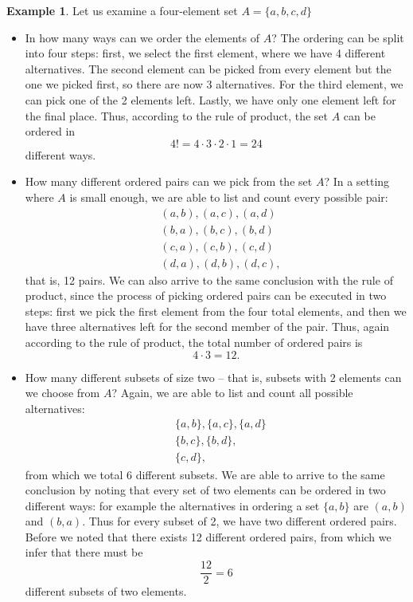 \documentclass[12pt,a4paper,leqno]{report}
\theoremstyle{plain}
\theoremstyle{definition}
\newtheorem{esim}[equation]{Example}
\begin{document}
\begin{esim}
Let us examine a four-element set $A = \{a,b,c,d\}$
\begin{itemize}
\item In how many ways can we order the elements of $A$? The ordering can be split into four steps: first, we select the first element, where we have 4 different alternatives. The second element can be picked from every element but the one we picked first, so there are now 3 alternatives. For the third element, we can pick one of the 2 elements left. Lastly, we have only one element left for the final place. Thus, according to the rule of product, the set $A$ can be ordered in
\[ 
4! = 4 \cdot 3 \cdot 2 \cdot 1 = 24 
\]
different ways.

\item How many different ordered pairs can we pick from the set $A$? In a setting where $A$ is small enough, we are able to list and count every possible pair:
\[
\begin{split}
&(a,b), (a,c), (a,d) \\
&(b,a), (b,c), (b,d) \\
&(c,a), (c,b), (c,d) \\ 
&(d,a), (d,b), (d,c),
\end{split}
\]
that is, 12 pairs. We can also arrive to the same conclusion with the rule of product, since the process of picking ordered pairs can be executed in two steps: first we pick the first element from the four total elements, and then we have three alternatives left for the second member of the pair. Thus, again according to the rule of product, the total number of ordered pairs is
\[
4 \cdot 3 = 12.
\] 

\item How many different subsets of size two -- that is, subsets with 2 elements can we choose from $A$? Again, we are able to list and count all possible alternatives:
\[
\begin{split}
&\{a,b\}, \{a,c\}, \{a,d\} \\
&\{b,c\}, \{b,d\}, \\
&\{c,d\},
\end{split}
\]
from which we total 6 different subsets. We are able to arrive to the same conclusion by noting that every set of two elements can be ordered in two different ways: for example the alternatives in ordering a set $\{a,b\}$ are $(a,b)$ and $(b,a)$. Thus for every subset of 2, we have two different ordered pairs. Before we noted that there exists 12 different ordered pairs, from which we infer that there must be
\[
\frac{12}{2} = 6 
\]
different subsets of two elements.
\end{itemize}
\end{esim}
\end{document}
